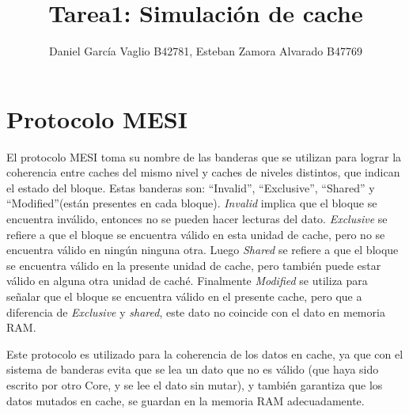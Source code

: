 \documentclass {article}
\begin{document}
\title{Tarea1: Simulación de cache}
\author{Daniel García Vaglio B42781, Esteban Zamora Alvarado B47769}
\maketitle



\section{Protocolo MESI}
El protocolo MESI toma su nombre de las banderas que se utilizan para lograr la coherencia entre
caches del mismo nivel y caches de niveles distintos, que
indican el estado del bloque. Estas banderas son: ``Invalid'', ``Exclusive'', ``Shared'' y
``Modified''(están presentes en cada bloque). \textit{Invalid} implica que el bloque se encuentra inválido, entonces no se pueden hacer
lecturas del dato. \textit{Exclusive} se refiere a que el bloque se encuentra válido en esta unidad de cache,
pero no se encuentra válido en ningún ninguna otra. Luego \textit{Shared} se refiere a que el bloque se
encuentra válido en la presente unidad de cache, pero también puede estar válido en alguna otra
unidad de caché. Finalmente \textit{Modified} se utiliza para señalar que el bloque se
encuentra válido en el presente cache, pero que a diferencia de \textit{Exclusive} y \textit{shared}, este dato no
coincide con el dato en memoria RAM.

Este protocolo es utilizado para la coherencia de los datos en cache, ya que con el sistema de
banderas evita que se lea un dato que no es válido (que haya sido escrito por otro Core, y se lee el
dato sin mutar), y también garantiza que los datos mutados en cache, se guardan en la memoria RAM
adecuadamente.
\end{document}
